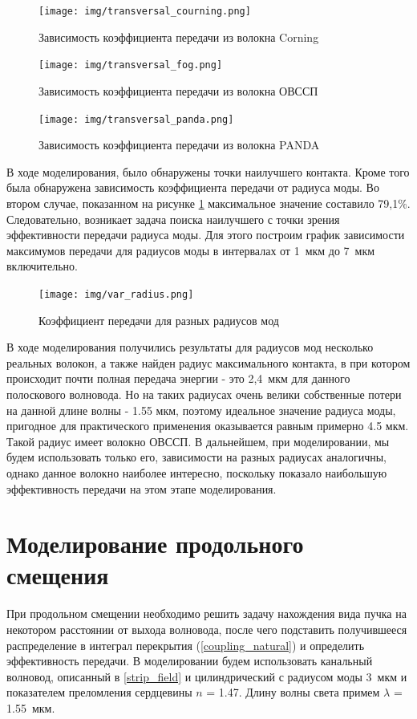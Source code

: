 \begin{figure}[h!]
		\texttt{[image: img/transversal\_courning.png]}
		\caption{Зависимость коэффициента передачи из волокна Corning}
\end{figure}
\begin{figure}[h!]
		\texttt{[image: img/transversal\_fog.png]}
		\caption{Зависимость коэффициента передачи из волокна ОВССП}
		\label{transversal_fog}
\end{figure}
\begin{figure}[h!]
		\texttt{[image: img/transversal\_panda.png]}
		\caption{Зависимость коэффициента передачи из волокна PANDA}
		\label{transversal_panda}
\end{figure}

В ходе моделирования, было обнаружены точки наилучшего контакта. Кроме того была обнаружена зависимость коэффициента передачи от радиуса моды. Во втором случае, показанном на рисунке \ref{transversal_fog} максимальное значение составило 79,1\%. Следовательно, возникает задача поиска наилучшего с точки зрения эффективности передачи радиуса моды. Для этого построим график зависимости максимумов передачи для радиусов моды в интервалах от 1~мкм до 7~мкм включительно.
\begin{figure}[h!]
		\texttt{[image: img/var\_radius.png]}
		\caption{Коэффициент передачи для разных радиусов мод}
\end{figure}

В ходе моделирования получились результаты для радиусов мод несколько реальных волокон, а также найден радиус максимального контакта, в при котором происходит почти полная передача энергии - это 2,4~мкм для данного полоскового волновода. Но на таких радиусах очень велики собственные потери на данной длине волны - 1.55 мкм, поэтому идеальное значение радиуса моды, пригодное для практического применения оказывается равным примерно 4.5 мкм. Такой радиус имеет волокно ОВССП. В дальнейшем, при моделировании, мы будем использовать только его, зависимости на разных радиусах аналогичны, однако данное волокно наиболее интересно, поскольку показало наибольшую эффективность передачи на этом этапе моделирования.

\section{Моделирование продольного смещения}

При продольном смещении необходимо решить задачу нахождения вида пучка на некотором расстоянии от выхода волновода, после чего подставить получившееся распределение в интеграл перекрытия (\ref{coupling_natural}) и определить эффективность передачи.
В моделировании будем использовать канальный волновод, описанный в \ref{strip_field} и цилиндрический с радиусом моды 3~мкм и показателем преломления сердцевины $n$ = 1.47. Длину волны света примем $\lambda$ = 1.55~мкм.

